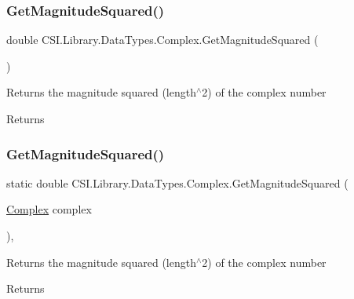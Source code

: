 \subsubsection{\texorpdfstring{GetMagnitudeSquared()}{GetMagnitudeSquared()}\hspace{0.1cm}{\footnotesize\ttfamily [1/2]}}
{\footnotesize\ttfamily double C\+S\+I.\+Library.\+Data\+Types.\+Complex.\+Get\+Magnitude\+Squared (\begin{DoxyParamCaption}{ }\end{DoxyParamCaption})\hspace{0.3cm}{\ttfamily [inline]}}



Returns the magnitude squared (length$^\wedge$2) of the complex number 

\begin{DoxyReturn}{Returns}

\end{DoxyReturn}
\mbox{\label{struct_c_s_i_1_1_library_1_1_data_types_1_1_complex_aafad62d0a28ec44bc2bd30b63cce89ae}} 
\subsubsection{\texorpdfstring{GetMagnitudeSquared()}{GetMagnitudeSquared()}\hspace{0.1cm}{\footnotesize\ttfamily [2/2]}}
{\footnotesize\ttfamily static double C\+S\+I.\+Library.\+Data\+Types.\+Complex.\+Get\+Magnitude\+Squared (\begin{DoxyParamCaption}\item[{\mbox{\hyperlink{struct_c_s_i_1_1_library_1_1_data_types_1_1_complex}{Complex}}}]{complex }\end{DoxyParamCaption})\hspace{0.3cm}{\ttfamily [inline]}, {\ttfamily [static]}}



Returns the magnitude squared (length$^\wedge$2) of the complex number 

\begin{DoxyReturn}{Returns}

\end{DoxyReturn}
\mbox{\label{struct_c_s_i_1_1_library_1_1_data_types_1_1_complex_a1149f7fbc2cecd84de8bdffc4cbf937a}} 
